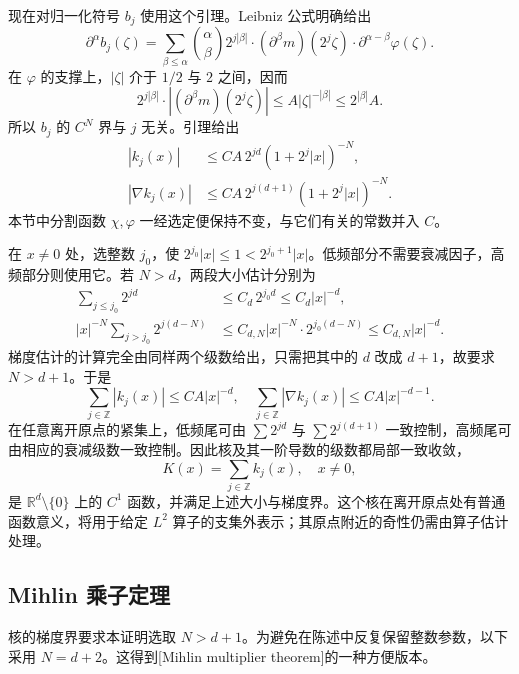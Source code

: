 现在对归一化符号 \(b_j\) 使用这个引理。Leibniz 公式明确给出
\[
 \partial^\alpha b_j(\zeta)
 =\sum_{\beta\leq\alpha}\binom{\alpha}{\beta}
 2^{j|\beta|}\cdot(\partial^\beta m)(2^j\zeta)
 \cdot\partial^{\alpha-\beta}\varphi(\zeta).
\]
在 \(\varphi\) 的支撑上，\(|\zeta|\) 介于 \(1/2\) 与 \(2\) 之间，因而
\[
 2^{j|\beta|}\cdot|(\partial^\beta m)(2^j\zeta)|
 \leq A|\zeta|^{-|\beta|}
 \leq 2^{|\beta|}A.
\]
所以 \(b_j\) 的 \(C^N\) 界与 \(j\) 无关。引理给出
\[
 \begin{aligned}
 |k_j(x)|&\leq C A\,2^{jd}(1+2^j|x|)^{-N},\\
 |\nabla k_j(x)|&\leq C A\,2^{j(d+1)}(1+2^j|x|)^{-N}.
 \end{aligned}
\]
本节中分割函数 \(\chi,\varphi\) 一经选定便保持不变，与它们有关的常数并入 \(C\)。

\ProseParagraphBreak
在 \(x\ne0\) 处，选整数 \(j_0\)，使 \(2^{j_0}|x|\leq1<2^{j_0+1}|x|\)。低频部分不需要衰减因子，高频部分则使用它。若 \(N>d\)，两段大小估计分别为
\[
 \begin{aligned}
 \sum_{j\leq j_0}2^{jd}
 &\leq C_d\,2^{j_0d}\leq C_d|x|^{-d},\\
 |x|^{-N}\sum_{j>j_0}2^{j(d-N)}
 &\leq C_{d,N}|x|^{-N}\cdot2^{j_0(d-N)}
 \leq C_{d,N}|x|^{-d}.
 \end{aligned}
\]
梯度估计的计算完全由同样两个级数给出，只需把其中的 \(d\) 改成 \(d+1\)，故要求 \(N>d+1\)。于是
\[
 \sum_{j\in\mathbb Z}|k_j(x)|\leq C A|x|^{-d},
 \quad
 \sum_{j\in\mathbb Z}|\nabla k_j(x)|
 \leq C A|x|^{-d-1}.
\]
在任意离开原点的紧集上，低频尾可由 \(\sum2^{jd}\) 与 \(\sum2^{j(d+1)}\) 一致控制，高频尾可由相应的衰减级数一致控制。因此核及其一阶导数的级数都局部一致收敛，
\[
 K(x)=\sum_{j\in\mathbb Z}k_j(x),\quad x\ne0,
\]
是 \(\mathbb R^d\setminus\{0\}\) 上的 \(C^1\) 函数，并满足上述大小与梯度界。这个核在离开原点处有普通函数意义，将用于给定 \(L^2\) 算子的支集外表示；其原点附近的奇性仍需由算子估计处理。

\subsection{Mihlin 乘子定理}
\label{b2:subsec:220203}

核的梯度界要求本证明选取 \(N>d+1\)。为避免在陈述中反复保留整数参数，以下采用 \(N=d+2\)。这得到[Mihlin multiplier theorem]的一种方便版本。

